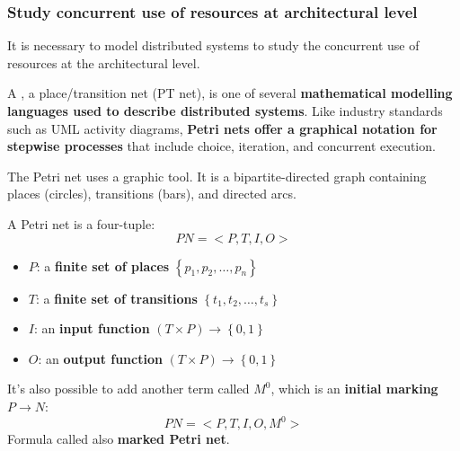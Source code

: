 \subsubsection{Study concurrent use of resources at architectural level}

It is necessary to model distributed systems to study the concurrent use of resources at the architectural level.

\highspace
A , a place/transition net (PT net), is one of several \textbf{mathematical modelling languages used to describe distributed systems}. Like industry standards such as UML activity diagrams, \textbf{Petri nets offer a graphical notation for stepwise processes} that include choice, iteration, and concurrent execution.

\highspace
The Petri net uses a graphic tool. It is a bipartite-directed graph containing places (circles), transitions (bars), and directed arcs.

\highspace
A Petri net is a four-tuple:
\begin{equation}
    PN = <P, T, I, O>
\end{equation}
\begin{itemize}
    \item $P$: a \textbf{finite set of places} $\left\{p_{1}, p_{2}, \dots, p_{n}\right\}$
    
    \item $T$: a \textbf{finite set of transitions} $\left\{t_{1}, t_{2}, \dots, t_{s}\right\}$
    
    \item $I$: an \textbf{input function} $\left(T \times P\right) \longrightarrow \left\{0,1\right\}$
    
    \item $O$: an \textbf{output function} $\left(T \times P\right) \longrightarrow \left\{0,1\right\}$
\end{itemize}
It's also possible to add another term called $M^{0}$, which is an \textbf{initial marking} $P \longrightarrow N$:
\begin{equation}
    PN = <P, T, I, O, M^{0}>
\end{equation}
Formula called also \textbf{marked Petri net}.

